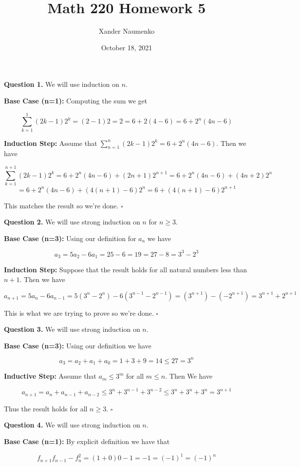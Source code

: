 \documentclass[letterpaper, reqno,11pt]{article}
\begin{document}
\title{Math 220 Homework 5}
\date{October 18, 2021}
\author{Xander Naumenko}
\maketitle

{\noindent\bf Question 1.} We will use induction on $n$. 

{\bf Base Case (n=1):} Computing the sum we get 

$$
    \sum_{k=1}^1(2k-1)2^k=(2-1)2=2=6+2(4-6)=6+2^n(4n-6)
$$

{\bf Induction Step:} Assume that $\sum_{n=1}^n(2k-1)2^k=6+2^n(4n-6)$. Then we have 

$$
    \sum_{k=1}^{n+1}(2k-1)2^{k}=6+2^n(4n-6)+(2n+1)2^{n+1}=6+2^n(4n-6)+(4n+2)2^n
$$
$$
    =6+2^n(4n-6)+(4(n+1)-6)2^n=6+(4(n+1)-6)2^{n+1}
$$

This matches the result so we're done. $\square$

{\noindent\bf Question 2.} We will use strong induction on $n$ for $n\geq 3$. 

{\bf Base Case (n=3):} Using our definition for $a_n$ we have 

$$
    a_3=5a_{2}-6a_1=25-6=19=27-8=3^3-2^3
$$

{\bf Induction Step:} Suppose that the result holds for all natural numbers less than $n+1$. Then we have 

$$
    a_{n+1}=5a_n-6a_{n-1}=5(3^n-2^n)-6(3^{n-1}-2^{n-1})=(3^{n+1})-(-2^{n+1})=3^{n+1}+2^{n+1}
$$

This is what we are trying to prove so we're done. $\square$

{\noindent\bf Question 3.} We will use strong induction on $n$. 

{\bf Base Case (n=3):} Using our definition we have 

$$
    a_3=a_2+a_1+a_0=1+3+9=14\leq 27=3^n
$$

{\bf Inductive Step:} Assume that $a_m\leq 3^m$ for all $m\leq n$. Then We have 

$$
    a_{n+1}=a_n+a_{n-1}+a_{n-2}\leq 3^n+3^{n-1}+3^{n-2}\leq 3^n+3^n+3^n=3^{n+1}
$$

Thus the result holds for all $n\geq 3$. $\square$

{\noindent\bf Question 4.} We will use strong induction on $n$. 

{\bf Base Case (n=1):} By explicit definition we have that 

$$
    f_{n+1}f_{n-1}-f_n^2=(1+0)0-1=-1=(-1)^1=(-1)^n
$$
\end{document}

